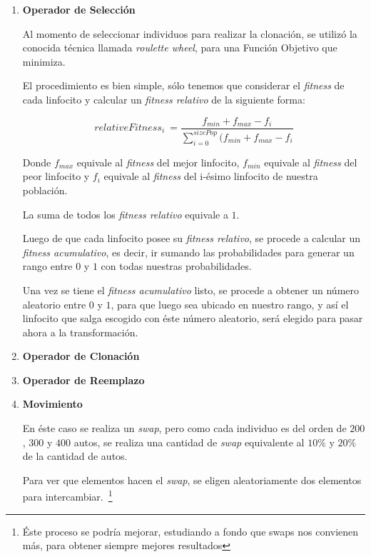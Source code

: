 \begin{enumerate}
	\item \textbf{Operador de Selección}

		Al momento de seleccionar individuos para realizar la clonación, se utilizó la conocida técnica llamada
		\emph{roulette wheel}, para una Función Objetivo que minimiza.
		
		El procedimiento es bien simple, sólo tenemos que considerar el \emph{fitness} de cada linfocito y calcular un
		\emph{fitness relativo} de la siguiente forma:
		
		$$relativeFitness_{i}\ = \frac{f_{min} + f_{max} - f_{i}}{\sum\limits_{i=0}^{sizePop} (f_{min} + f_{max} - f_{i}}$$
		
		Donde $f_{max}$ equivale al \emph{fitness} del mejor linfocito,
		$f_{min}$ equivale al \emph{fitness} del peor linfocito y
		$f_{i}$ equivale al \emph{fitness} del i-ésimo linfocito de nuestra población.
		
		La suma de todos los \emph{fitness relativo} equivale a $1$.
			
		Luego de que cada linfocito posee su \emph{fitness relativo}, se procede a calcular un \emph{fitness acumulativo},
		es decir, ir sumando las probabilidades para generar un rango entre $0$ y $1$ con todas nuestras probabilidades.
			
		Una vez se tiene el \emph{fitness acumulativo} listo, se procede a obtener un número aleatorio entre $0$ y $1$,
		para que luego sea ubicado en nuestro rango, y así el linfocito que salga escogido con éste número aleatorio, será
		elegido para pasar ahora a la transformación.



	\item \textbf{Operador de Clonación}


			

	\item \textbf{Operador de Reemplazo}




	\item \textbf{Movimiento}

		En éste caso se realiza un \emph{swap}, pero como cada individuo es del orden de $200$, $300$ y $400$ autos,
		se realiza una cantidad de \emph{swap} equivalente al $10\%$ y $20\%$ de la cantidad de autos.
	
		Para ver que elementos hacen el \emph{swap}, se eligen aleatoriamente dos elementos para intercambiar.~\footnote{
		Éste proceso se podría mejorar, estudiando a fondo que swaps nos convienen más, para obtener siempre mejores
		resultados}


\end{enumerate}
